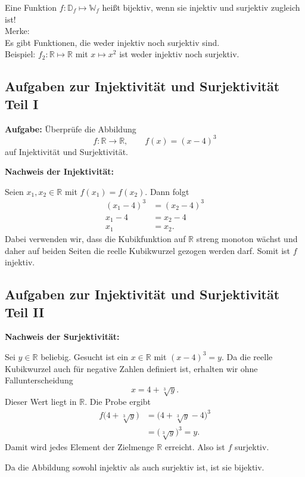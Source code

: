 Eine Funktion $f:\mathbb{D}_f\longmapsto\mathbb{W}_f$ heißt bijektiv, wenn sie injektiv und surjektiv zugleich ist!\vspace*{2mm}\\
Merke:\\
Es gibt Funktionen, die weder injektiv noch surjektiv sind.\\
Beispiel: $f_2:\mathbb{R}\longmapsto\mathbb{R}$ mit $x\longmapsto x^2$ ist weder injektiv noch surjektiv.\\
\subsection{Aufgaben zur Injektivität und Surjektivität Teil I}

\textbf{Aufgabe:} Überprüfe die Abbildung
\[
f:\mathbb{R}\longrightarrow\mathbb{R},\qquad f(x)=(x-4)^3
\]
auf Injektivität und Surjektivität.

\textbf{Nachweis der Injektivität:}

Seien $x_1,x_2\in\mathbb{R}$ mit $f(x_1)=f(x_2)$.
Dann folgt
\begin{align*}
(x_1-4)^3&=(x_2-4)^3\\
x_1-4&=x_2-4\\
x_1&=x_2.
\end{align*}
Dabei verwenden wir, dass die Kubikfunktion auf
$\mathbb{R}$ streng monoton wächst und daher
auf beiden Seiten die reelle Kubikwurzel gezogen
werden darf. Somit ist $f$ injektiv.

\subsection{Aufgaben zur Injektivität und Surjektivität Teil II}

\textbf{Nachweis der Surjektivität:}

Sei $y\in\mathbb{R}$ beliebig. Gesucht ist ein
$x\in\mathbb{R}$ mit $(x-4)^3=y$.
Da die reelle Kubikwurzel auch für negative Zahlen
definiert ist, erhalten wir ohne Fallunterscheidung
\[
x=4+\sqrt[3]{y}.
\]
Dieser Wert liegt in $\mathbb{R}$. Die Probe ergibt
\begin{align*}
f\bigl(4+\sqrt[3]{y}\bigr)
&=\bigl(4+\sqrt[3]{y}-4\bigr)^3\\
&=\bigl(\sqrt[3]{y}\bigr)^3=y.
\end{align*}
Damit wird jedes Element der Zielmenge $\mathbb{R}$
erreicht. Also ist $f$ surjektiv.

Da die Abbildung sowohl injektiv als auch surjektiv
ist, ist sie bijektiv.
